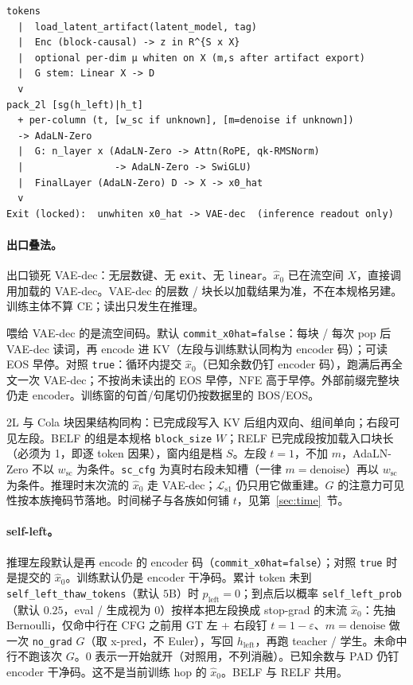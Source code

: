 \documentclass[UTF8,a4paper,11pt]{ctexart}
\begin{document}
\begin{verbatim}
tokens
  |  load_latent_artifact(latent_model, tag)
  |  Enc (block-causal) -> z in R^{S x X}
  |  optional per-dim μ whiten on X (m,s after artifact export)
  |  G stem: Linear X -> D
  v
pack_2l [sg(h_left)|h_t]
  + per-column (t, [w_sc if unknown], [m=denoise if unknown])
  -> AdaLN-Zero
  |  G: n_layer x (AdaLN-Zero -> Attn(RoPE, qk-RMSNorm)
  |                -> AdaLN-Zero -> SwiGLU)
  |  FinalLayer (AdaLN-Zero) D -> X -> x0_hat
  v
Exit (locked):  unwhiten x0_hat -> VAE-dec  (inference readout only)
\end{verbatim}

\paragraph{出口叠法。}
出口锁死 VAE-dec：无层数键、无 \texttt{exit}、无 \texttt{linear}。\(\hat x_0\) 已在流空间 \(X\)，直接调用加载的 VAE-dec。VAE-dec 的层数 / 块长以加载结果为准，不在本规格另建。训练主体不算 CE；读出只发生在推理。

喂给 VAE-dec 的是流空间码。默认 \texttt{commit\_x0hat=false}：每块 / 每次 pop 后 VAE-dec 读词，再 encode 进 KV（左段与训练默认同构为 encoder 码）；可读 EOS 早停。对照 \texttt{true}：循环内提交 \(\hat x_0\)（已知余数仍钉 encoder 码），跑满后再全文一次 VAE-dec；不按尚未读出的 EOS 早停，NFE 高于早停。外部前缀完整块仍走 encoder。训练窗的句首/句尾切仍按数据里的 BOS/EOS。

2L 与 Cola 块因果结构同构：已完成段写入 KV 后组内双向、组间单向；右段可见左段。BELF 的组是本规格 \texttt{block\_size} \(W\)；RELF 已完成段按加载入口块长（必须为 1，即逐 token 因果），窗内组是档 \(S\)。左段 \(t=1\)，不加 \(m\)，AdaLN-Zero 不以 \(w_{\mathrm{sc}}\) 为条件。\texttt{sc\_cfg} 为真时右段未知槽（一律 \(m=\mathrm{denoise}\)）再以 \(w_{\mathrm{sc}}\) 为条件。推理时末次流的 \(\hat x_0\) 走 VAE-dec；\(\mathcal{L}_{\mathrm{s1}}\) 仍只用它做重建。\(G\) 的注意力可见性按本族掩码节落地。时间梯子与各族如何铺 \(t\)，见第~\ref{sec:time}~节。

\paragraph{self-left。}
\label{sec:self-left}
推理左段默认是再 encode 的 encoder 码（\texttt{commit\_x0hat=false}）；对照 \texttt{true} 时是提交的 \(\hat x_0\)。训练默认仍是 encoder 干净码。累计 token 未到 \texttt{self\_left\_thaw\_tokens}（默认 \(5\mathrm{B}\)）时 \(p_{\mathrm{left}}=0\)；到点后以概率 \texttt{self\_left\_prob}（默认 \(0.25\)，eval / 生成视为 0）按样本把左段换成 stop-grad 的末流 \(\hat x_0\)：先抽 Bernoulli，仅命中行在 CFG 之前用 GT 左 + 右段钉 \(t=1-\varepsilon\)、\(m=\mathrm{denoise}\) 做一次 \texttt{no\_grad} \(G\)（取 x-pred，不 Euler），写回 \(h_{\mathrm{left}}\)，再跑 teacher / 学生。未命中行不跑该次 \(G\)。\(0\) 表示一开始就开（对照用，不列消融）。已知余数与 PAD 仍钉 encoder 干净码。这不是当前训练 hop 的 \(\hat x_0\)。BELF 与 RELF 共用。
\end{document}
